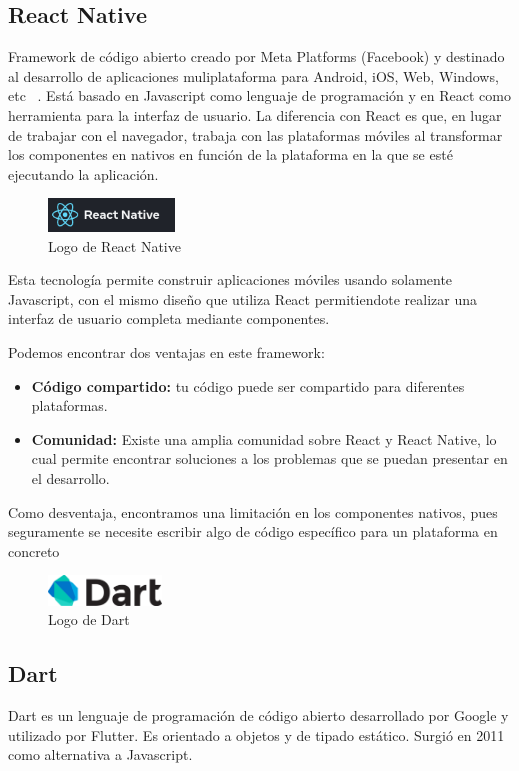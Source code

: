 \subsection{React Native}
Framework de código abierto creado por Meta Platforms (Facebook) y destinado al desarrollo de aplicaciones muliplataforma para Android, iOS, Web, Windows, etc ~\cite{reactnative}.
Está basado en Javascript como lenguaje de programación y en React como herramienta para la interfaz de usuario. La diferencia con React es que, en lugar de 
trabajar con el navegador, trabaja con las plataformas móviles al transformar los componentes en nativos en función de la plataforma en la que se esté
ejecutando la aplicación. 
\begin{figure}[H]
    \centering
    \includegraphics[width=0.3\textwidth]{imagenes/c2/reactnative.png}
    \caption{Logo de React Native}
    \end{figure}
    
Esta tecnología permite construir aplicaciones móviles usando solamente Javascript, con el mismo diseño que utiliza
React permitiendote realizar una interfaz de usuario completa mediante componentes. 



Podemos encontrar dos ventajas en este framework:

\begin{itemize}
\item \textbf{Código compartido:} tu código puede ser compartido para diferentes plataformas.
\item \textbf{Comunidad:} Existe una amplia comunidad sobre React y React Native, lo cual permite encontrar soluciones a los problemas que se puedan presentar en el desarrollo.
\end {itemize}

Como desventaja, encontramos una limitación en los componentes nativos, pues seguramente se necesite escribir algo de código
específico para un plataforma en concreto


\begin{figure}
    \vspace*{-0.4cm}

    \centering
    \includegraphics[width=0.27\textwidth]{imagenes/c2/dart.png}
    \caption{Logo de Dart}
\end{figure}\subsection{Dart}
Dart es un lenguaje de programación de código abierto desarrollado por Google y utilizado por Flutter.
Es orientado a objetos y de tipado estático. Surgió en 2011 como alternativa a Javascript.

